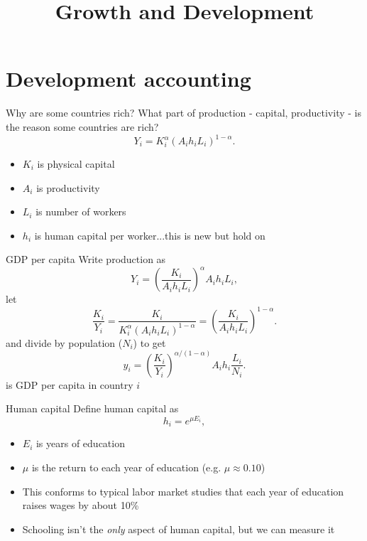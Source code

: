

\title[Development]{Growth and Development}



\maketitle

\section{Development accounting}
\begin{frame}{Why are some countries rich?}
What part of production - capital, productivity - is the reason some countries are rich? 
\begin{equation}
	Y_i = K_i^{\alpha} (A_i h_i L_i)^{1-\alpha}. \nonumber
\end{equation}
\begin{itemize}
	\item $K_i$ is physical capital
	\item $A_i$ is productivity
	\item $L_i$ is number of workers
	\item $h_i$ is human capital per worker...this is new but hold on
\end{itemize}
\end{frame}

\begin{frame}{GDP per capita}
Write production as
\begin{equation}
	Y_i = \left(\frac{K_i}{A_i h_i L_i} \right)^{\alpha} A_i h_i L_i, \label{EQ_Y_kahl}
\end{equation}
let 
\begin{equation}
	\frac{K_i}{Y_i} = \frac{K_i}{K_i^{\alpha} (A_i h_i L_i)^{1-\alpha}} = \left(\frac{K_i}{A_i h_i L_i} \right)^{1-\alpha}. \nonumber
\end{equation}
and divide by population ($N_i$) to get
\begin{equation}
	y_i = \left(\frac{K_i}{Y_i}\right)^{\alpha/(1-\alpha)} A_i h_i \frac{L_i}{N_i}. \label{EQ_y_i}
\end{equation}
is GDP per capita in country $i$
\end{frame}

\begin{frame}{Human capital}
Define human capital as
\begin{equation}
 	h_i = e^{\mu E_i}, \label{EQ_h_i}
\end{equation} 
\begin{itemize}
	\item $E_i$ is years of education
	\item $\mu$ is the return to each year of education (e.g. $\mu \approx 0.10$)
	\item This conforms to typical labor market studies that each year of education raises wages by about 10\%
	\item Schooling isn't the \textit{only} aspect of human capital, but we can measure it
\end{itemize}
\end{frame}

